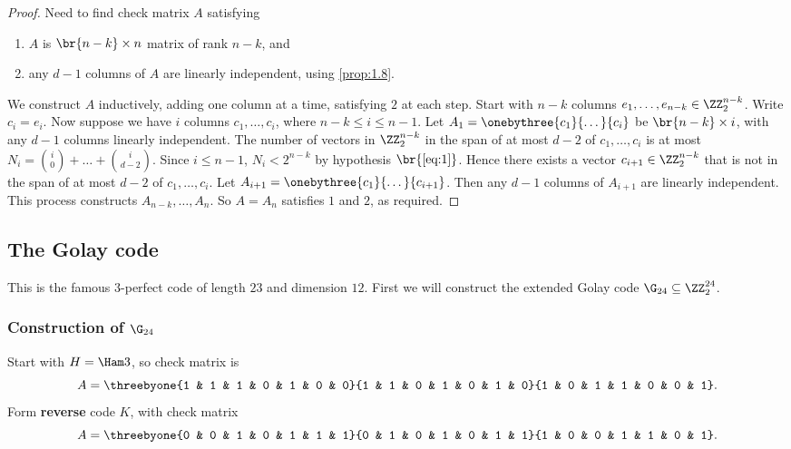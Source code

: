 \begin{proof}
Need to find check matrix $ A $ satisfying
\begin{enumerate}
\item $ A $ is $ \br{n - k} \times n $ matrix of rank $ n - k $, and
\item any $ d - 1 $ columns of $ A $ are linearly independent, using \ref{prop:1.8}.
\end{enumerate}
We construct $ A $ inductively, adding one column at a time, satisfying $ 2 $ at each step. Start with $ n - k $ columns $ e_1, \dots, e_{n - k} \in \ZZ_2^{n - k} $. Write $ c_i = e_i $. Now suppose we have $ i $ columns $ c_1, \dots, c_i $, where $ n - k \le i \le n - 1 $. Let $ A_1 = \onebythree{c_1}{\dots}{c_i} $ be $ \br{n - k} \times i $, with any $ d - 1 $ columns linearly independent. The number of vectors in $ \ZZ_2^{n - k} $ in the span of at most $ d - 2 $ of $ c_1, \dots, c_i $ is at most $ N_i = \binom{i}{0} + \dots + \binom{i}{d - 2} $. Since $ i \le n - 1 $, $ N_i < 2^{n - k} $ by hypothesis $ \br{\ref{eq:1}} $. Hence there exists a vector $ c_{i + 1} \in \ZZ_2^{n - k} $ that is not in the span of at most $ d - 2 $ of $ c_1, \dots, c_i $. Let $ A_{i + 1} = \onebythree{c_1}{\dots}{c_{i + 1}} $. Then any $ d - 1 $ columns of $ A_{i + 1} $ are linearly independent. This process constructs $ A_{n - k}, \dots, A_n $. So $ A = A_n $ satisfies $ 1 $ and $ 2 $, as required.
\end{proof}

\subsection{The Golay code}


This is the famous $ 3 $-perfect code of length $ 23 $ and dimension $ 12 $. First we will construct the extended Golay code $ \G_{24} \subseteq \ZZ_2^{24} $.

\subsubsection{Construction of \texorpdfstring{$ \G_{24} $}{G24}}

Start with $ H = \Ham 3 $, so check matrix is
$$ A = \threebyone{1 & 1 & 1 & 0 & 1 & 0 & 0}{1 & 1 & 0 & 1 & 0 & 1 & 0}{1 & 0 & 1 & 1 & 0 & 0 & 1}. $$
Form \textbf{reverse} code $ K $, with check matrix
$$ A = \threebyone{0 & 0 & 1 & 0 & 1 & 1 & 1}{0 & 1 & 0 & 1 & 0 & 1 & 1}{1 & 0 & 0 & 1 & 1 & 0 & 1}. $$

